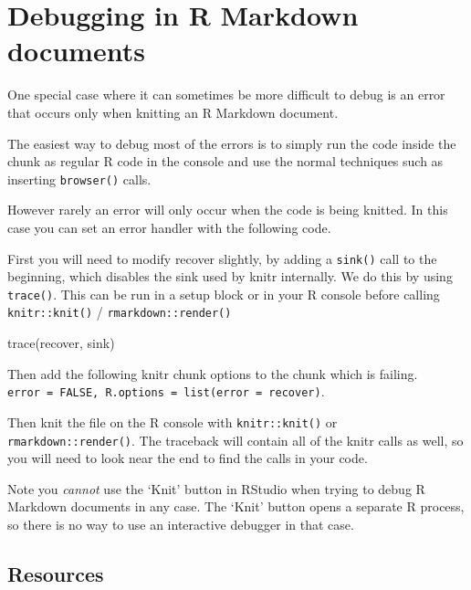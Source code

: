\documentclass[
  letterpaper,
]{book}
\newenvironment{Shaded}{\begin{snugshade}}{\end{snugshade}}
\newcommand{\FunctionTok}[1]{\textcolor[rgb]{0.28,0.35,0.67}{#1}}
\newcommand{\NormalTok}[1]{\textcolor[rgb]{0.00,0.23,0.31}{#1}}
\begin{document}
\hypertarget{debugging-in-r-markdown-documents}{%
\section*{Debugging in R Markdown
documents}\label{debugging-in-r-markdown-documents}}

One special case where it can sometimes be more difficult to debug is an
error that occurs only when knitting an R Markdown document.

The easiest way to debug most of the errors is to simply run the code
inside the chunk as regular R code in the console and use the normal
techniques such as inserting \texttt{browser()} calls.

However rarely an error will only occur when the code is being knitted.
In this case you can set an error handler with the following code.

First you will need to modify recover slightly, by adding a
\texttt{sink()} call to the beginning, which disables the sink used by
knitr internally. We do this by using \texttt{trace()}. This can be run
in a setup block or in your R console before calling
\texttt{knitr::knit()} / \texttt{rmarkdown::render()}

\begin{Shaded}
\begin{Highlighting}[]
\FunctionTok{trace}\NormalTok{(recover, sink)}
\end{Highlighting}
\end{Shaded}

Then add the following knitr chunk options to the chunk which is
failing.
\texttt{error\ =\ FALSE,\ R.options\ =\ list(error\ =\ recover)}.

Then knit the file on the R console with \texttt{knitr::knit()} or
\texttt{rmarkdown::render()}. The traceback will contain all of the
knitr calls as well, so you will need to look near the end to find the
calls in your code.

\begin{rmdwarning}
Note you \emph{cannot} use the `Knit' button in RStudio when trying to
debug R Markdown documents in any case. The `Knit' button opens a
separate R process, so there is no way to use an interactive debugger in
that case.
\end{rmdwarning}

\hypertarget{resources}{%
\subsection*{Resources}\label{resources}}
\end{document}
